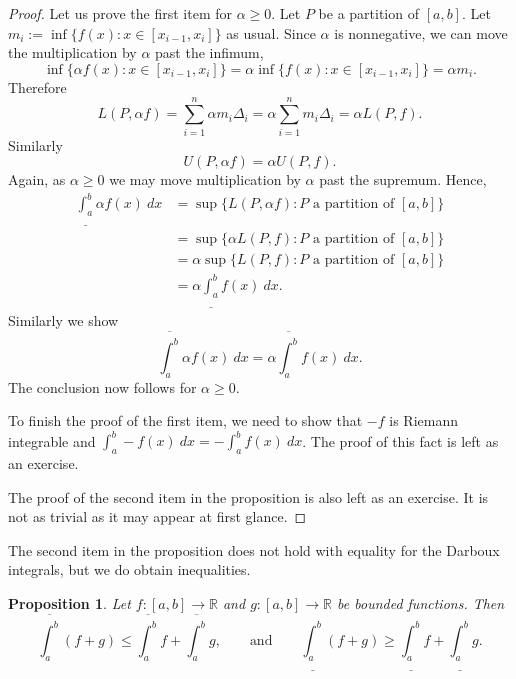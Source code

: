 \documentclass[12pt]{book}
\newcommand{\R}{{\mathbb{R}}}
\theoremstyle{plain}
\newtheorem{prop}[thm]{Proposition}
\theoremstyle{remark}
\theoremstyle{definition}
\theoremstyle{exercise}
\theoremstyle{example}
\begin{document}
\begin{proof}
Let us prove the first item for $\alpha \geq 0$. 
Let $P$ be a partition of $[a,b]$.
Let $m_i := \inf \{ f(x) : x \in [x_{i-1},x_i] \}$ as usual.
Since $\alpha$ is nonnegative, we can move the multiplication by $\alpha$
past the infimum,
\begin{equation*}
\inf \{ \alpha f(x) : x \in [x_{i-1},x_i] \}
=
\alpha \inf \{ f(x) : x \in [x_{i-1},x_i] \} = \alpha m_i .
\end{equation*}
Therefore
\begin{equation*}
L(P,\alpha f) =
\sum_{i=1}^n \alpha m_i \Delta_i = \alpha \sum_{i=1}^n m_i \Delta_i = \alpha
L(P,f).
\end{equation*}
Similarly 
\begin{equation*}
U(P,\alpha f) = \alpha U(P,f) .
\end{equation*}
Again, as $\alpha \geq 0$ we
may move multiplication by $\alpha$ past the supremum.  Hence,
\begin{equation*}
\begin{split}
\underline{\int_a^b} \alpha f(x)~dx & =
\sup \{ L(P,\alpha f) : \text{$P$ a partition of $[a,b]$} \}
\\
& =
\sup \{ \alpha L(P,f) : \text{$P$ a partition of $[a,b]$} \}
\\
& =
\alpha
\sup \{ L(P,f) : \text{$P$ a partition of $[a,b]$} \}
\\
& =
\alpha
\underline{\int_a^b} f(x)~dx .
\end{split}
\end{equation*}
Similarly we show 
\begin{equation*}
\overline{\int_a^b} \alpha f(x)~dx
=
\alpha
\overline{\int_a^b} f(x)~dx .
\end{equation*}
The conclusion now follows for $\alpha \geq 0$.

To finish the proof of the first item, we need to show 
that $-f$ is Riemann integrable and
$\int_a^b - f(x)~dx =
-
\int_a^b f(x)~dx$.  The proof of this fact is left as an exercise.

The proof of the second item in the proposition is also left as an exercise.
It is not as
trivial as it may appear at first glance.
\end{proof}

The second item in the proposition does not hold with
equality for the Darboux integrals, but we do obtain inequalities.

\begin{prop} \label{prop:upperlowerlinineq}
Let $f \colon [a,b] \to \R$ and $g \colon [a,b] \to \R$ be bounded
functions.  Then
\begin{equation*}
\overline{\int_a^b} (f+g) \leq \overline{\int_a^b}f+\overline{\int_a^b}g
,
\qquad
\text{and}
\qquad
\underline{\int_a^b} (f+g) \geq \underline{\int_a^b}f+\underline{\int_a^b}g
.
\end{equation*}
\end{prop}
\end{document}

